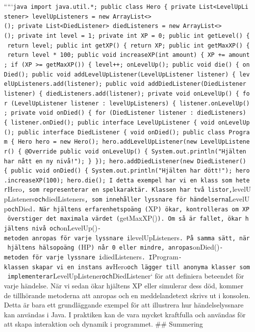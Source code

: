`````\texttt{java\ import\ java.util.*;\ public\ class\ Hero\ \{\ private\ List\textless{}LevelUpListener\textgreater{}\ levelUpListeners\ =\ new\ ArrayList\textless{}\textgreater{}();\ private\ List\textless{}DiedListener\textgreater{}\ diedListeners\ =\ new\ ArrayList\textless{}\textgreater{}();\ private\ int\ level\ =\ 1;\ private\ int\ XP\ =\ 0;\ public\ int\ getLevel()\ \{\ return\ level;\ public\ int\ getXP()\ \{\ return\ XP;\ public\ int\ getMaxXP()\ \{\ return\ level\ *\ 100;\ public\ void\ increaseXP(int\ amount)\ \{\ XP\ +=\ amount;\ if\ (XP\ \textgreater{}=\ getMaxXP())\ \{\ level++;\ onLevelUp();\ public\ void\ die()\ \{\ onDied();\ public\ void\ addLevelUpListener(LevelUpListener\ listener)\ \{\ levelUpListeners.add(listener);\ public\ void\ addDiedListener(DiedListener\ listener)\ \{\ diedListeners.add(listener);\ private\ void\ onLevelUp()\ \{\ for\ (LevelUpListener\ listener\ :\ levelUpListeners)\ \{\ listener.onLevelUp();\ private\ void\ onDied()\ \{\ for\ (DiedListener\ listener\ :\ diedListeners)\ \{\ listener.onDied();\ public\ interface\ LevelUpListener\ \{\ void\ onLevelUp();\ public\ interface\ DiedListener\ \{\ void\ onDied();\ public\ class\ Program\ \{\ Hero\ hero\ =\ new\ Hero();\ hero.addLevelUpListener(new\ LevelUpListener()\ \{\ @Override\ public\ void\ onLevelUp()\ \{\ System.out.println("Hjälten\ har\ nått\ en\ ny\ nivå!");\ \}\ \});\ hero.addDiedListener(new\ DiedListener()\ \{\ public\ void\ onDied()\ \{\ System.out.println("Hjälten\ har\ dött!");\ hero.increaseXP(100);\ hero.die();\ I\ detta\ exempel\ har\ vi\ en\ klass\ som\ heter}Hero\texttt{,\ som\ representerar\ en\ spelkaraktär.\ Klassen\ har\ två\ listor,}levelUpListeners\texttt{och}diedListeners\texttt{,\ som\ innehåller\ lyssnare\ för\ händelserna}LevelUp\texttt{och}Died\texttt{.\ När\ hjältens\ erfarenhetspoäng\ (}XP\texttt{)\ ökar,\ kontrolleras\ om\ XP\ överstiger\ det\ maximala\ värdet\ (}getMaxXP()\texttt{).\ Om\ så\ är\ fallet,\ ökar\ hjältens\ nivå\ och}onLevelUp()\texttt{-metoden\ anropas\ för\ varje\ lyssnare\ i}levelUpListeners\texttt{.\ På\ samma\ sätt,\ när\ hjältens\ hälsopoäng\ (}HP\texttt{)\ når\ 0\ eller\ mindre,\ anropas}onDied()\texttt{-metoden\ för\ varje\ lyssnare\ i}diedListeners\texttt{.\ I}Program\texttt{-klassen\ skapar\ vi\ en\ instans\ av}Hero\texttt{och\ lägger\ till\ anonyma\ klasser\ som\ implementerar}LevelUpListener\texttt{och}DiedListener`
för att definiera beteendet för varje händelse. När vi sedan ökar
hjältens XP eller simulerar dess död, kommer de tillhörande metoderna
att anropas och en meddelandetext skrivs ut i konsolen. Detta är bara
ett grundläggande exempel för att illustrera hur händelselyssnare kan
användas i Java. I praktiken kan de vara mycket kraftfulla och användas
för att skapa interaktion och dynamik i programmet. \#\# Summering

